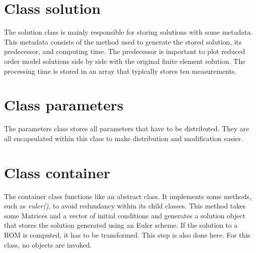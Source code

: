 \section{Class solution}
The solution class is mainly responsible for storing solutions with some metadata.
This metadata consists of the method used to generate the stored solution, its predecessor, and computing time.
The predecessor is important to plot reduced order model solutions side by side with the original finite element solution.
The processing time is stored in an array that typically stores ten measurements.

\section{Class parameters}
The parameters class stores all parameters that have to be distributed.
They are all encapsulated within this class to make distribution and modification easier.

\section{Class container}
The container class functions like an abstract class.
It implements some methods, such as \textit{euler()}, to avoid redundancy within its child classes.
This method takes some Matrices and a vector of initial conditions and generates a solution object that stores the solution generated using an Euler scheme.
If the solution to a ROM is computed, it has to be transformed.
This step is also done here.
For this class, no objects are invoked.

